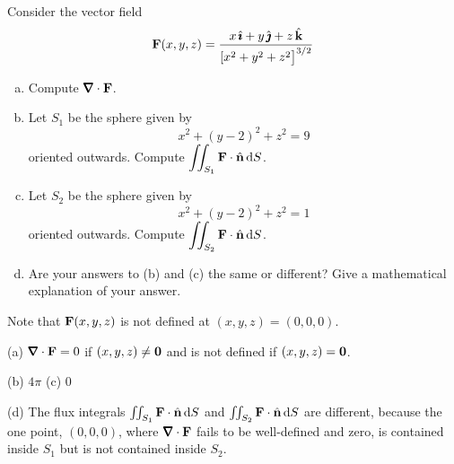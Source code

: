 \begin{question}[M317 2012J] %
Consider the vector field
\begin{equation*}
\mathbf{F}(x,y,z) = \frac{x\,\hat{\pmb{\imath}}+y\,\hat{\pmb{\jmath}}+z\,\hat{\mathbf{k}}}
                  {{[x^2 + y^2 + z^2\big]}^{3/2}}
\end{equation*}
\begin{enumerate}[(a)]
\item
   Compute $\vnabla\cdot\vF$.
\item
Let $S_1$ be the sphere given by
\begin{equation*}
x^2 + (y - 2)^2 + z^2 = 9
\end{equation*}
oriented outwards. Compute
$\displaystyle\iint_{S_1} \mathbf{F}\cdot\hat{\mathbf{n}}\,\mathrm{d}S$.
\item
Let $S_2$ be the sphere given by
\begin{equation*}
x^2 + (y - 2)^2 + z^2 = 1
\end{equation*}
oriented outwards. Compute
$\displaystyle\iint_{S_2} \mathbf{F}\cdot\hat{\mathbf{n}}\,\mathrm{d}S$.
\item
Are your answers to (b) and (c) the same or different? Give a 
mathematical explanation of your answer.
\end{enumerate}

\end{question}

\begin{hint} 
Note that $\mathbf{F}(x,y,z)$ is not defined at $(x,y,z)=(0,0,0)$.
\end{hint}

\begin{answer} 
(a) $\vnabla\cdot\vF=0$ if $(x,y,z)\ne\mathbf{0}$ and is not defined if $(x,y,z)=\mathbf{0}$.

(b) $4\pi$\qquad
(c) $0$

(d) The flux integrals $\iint_{S_1} \mathbf{F}\cdot\hat{\mathbf{n}}\,\mathrm{d}S$ and
$\iint_{S_2} \mathbf{F}\cdot\hat{\mathbf{n}}\,\mathrm{d}S$ are different, because the one point,
$(0,0,0)$, where $\vnabla\cdot\vF$ fails to be well-defined and zero,
is contained inside $S_1$ but is not contained inside $S_2$.
\end{answer}

